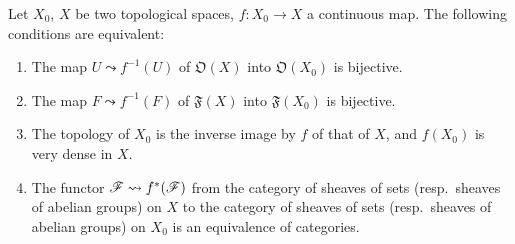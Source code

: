 \begin{proposition}[10.2.1]
\label{IV.10.2.1}
Let $X_0$, $X$ be two topological spaces, $f:X_0\to X$ a continuous map.
The following conditions are equivalent:
\begin{enumerate}[label=\emph{\alph*)}]
  \item The map $U\leadsto f^{-1}(U)$ of $\mathfrak{O}(X)$ into $\mathfrak{O}(X_0)$ is bijective.
  \item[\rm a$'$)] The map $F\leadsto f^{-1}(F)$ of $\mathfrak{F}(X)$ into $\mathfrak{F}(X_0)$ is bijective.
  \item The topology of $X_0$ is the inverse image by $f$ of that of $X$, and $f(X_0)$ is very dense  in $X$.
  \item The functor $\mathscr{F}\leadsto f^*(\mathscr{F})$ from the category of sheaves of sets (\textup{resp.}\ sheaves of abelian groups) on $X$ to the category of sheaves of sets (\textup{resp.}\ sheaves of abelian groups) on $X_0$ is an equivalence of categories.
\end{enumerate}
\end{proposition}

